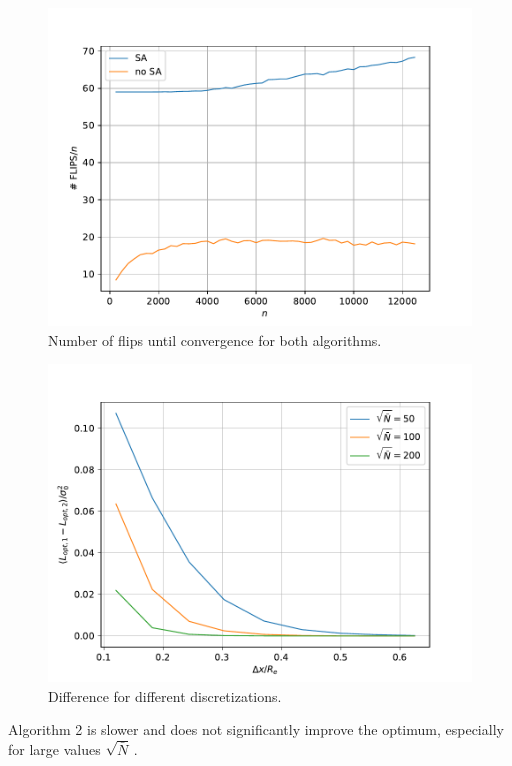 \documentclass[bachelor,       %
               twoside,        %
               BCOR10mm,       %
               ngerman, english %
               ]{GAUBM}
\begin{document}
\begin{figure}[h]
    \centering
    \includegraphics[width=0.6\linewidth]{figures/flips_var_rhoc_dphi0.pdf}
    \caption{Number of flips until convergence for both algorithms.}
    \label{fig:flips}
\end{figure}

\begin{figure}[h]
    \centering
    \includegraphics[width=0.6\linewidth]{figures/opt_var_dx_dphi0.pdf}
    \caption{Difference for different discretizations.}
    \label{fig:opt_var_dx_dphi0}
\end{figure}


Algorithm 2 is slower and does not significantly improve the optimum, especially for large values $\sqrt{\bar N}\,.$ 



\end{document}

